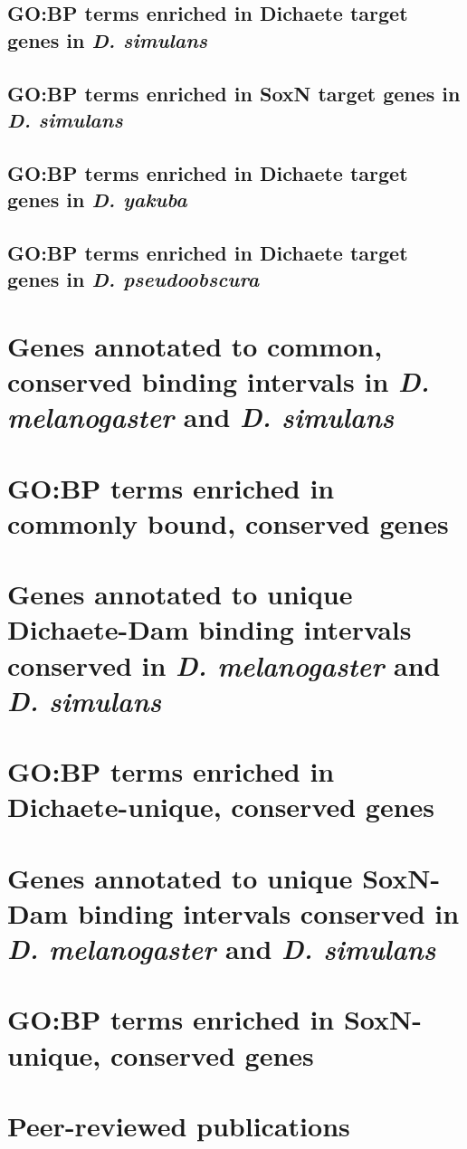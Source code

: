 \section{GO:BP terms enriched in Dichaete target genes in \emph{D. simulans}}

\section{GO:BP terms enriched in SoxN target genes in \emph{D. simulans}}

\section{GO:BP terms enriched in Dichaete target genes in \emph{D. yakuba}}

\section{GO:BP terms enriched in Dichaete target genes in \emph{D. pseudoobscura}}


\chapter{Genes annotated to common, conserved binding intervals in \emph{D. melanogaster} and \emph{D. simulans}}

\chapter{GO:BP terms enriched in commonly bound, conserved genes}

\chapter{Genes annotated to unique Dichaete-Dam binding intervals conserved in \emph{D. melanogaster} and \emph{D. simulans}}

\chapter{GO:BP terms enriched in Dichaete-unique, conserved genes} 

\chapter{Genes annotated to unique SoxN-Dam binding intervals conserved in \emph{D. melanogaster} and \emph{D. simulans}}

\chapter{GO:BP terms enriched in SoxN-unique, conserved genes}




\chapter{Peer-reviewed publications}


